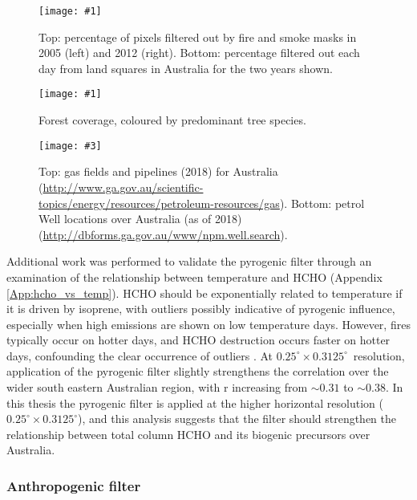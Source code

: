 \documentclass[acp, manuscript]{copernicus}
\newcommand{\parencite}{\citep}
\newcommand{\textcite}{\citet}
\newcommand{\highhr}{$0.25^{\circ} \times 0.3125^{\circ}$}
\newcommand{\mypic}[3]{%
  \begin{figure}
    \texttt{[image: \#1]}
    \caption{#2}
    #3
  \end{figure}
}
\newcommand{\mypicwh}[5]{
  \begin{figure}
    \captionsetup{width=#1}
    \texttt{[image: \#3]}
    \caption{#4}
    #5
  \end{figure}
}
\begin{document}
    \mypic{Figures/Filters/Pyrogenic_filter_annotated_3.png}{%
      Top: percentage of pixels filtered out by fire and smoke masks in 2005 (left) and 2012 (right).
      Bottom: percentage filtered out each day from land squares in Australia for the two years shown.
    }{\label{Model:filter:fire:fig_portion_filtered_2005}}
    
    \mypic{Figures/Australiasforests_2016.png}{%
      Forest coverage, coloured by predominant tree species.
    }{\label{Model:filter:fire:fig_forest_coverage}}
    
    \mypicwh{\textwidth}{\textheight}{Figures/Gas_Petrol_AUS.jpg}{%
      Top: gas fields and pipelines (2018) for Australia (\url{http://www.ga.gov.au/scientific-topics/energy/resources/petroleum-resources/gas}).
      Bottom: petrol Well locations over Australia (as of 2018) (\url{http://dbforms.ga.gov.au/www/npm.well.search}).
    }{\label{Model:filter:fire:fig_petrol_and_gas}}
    
    
    
    Additional work was performed to validate the pyrogenic filter through an examination of the relationship between temperature and HCHO (Appendix \ref{App:hcho_vs_temp}).
    HCHO should be exponentially related to temperature if it is driven by isoprene, with outliers possibly indicative of pyrogenic influence, especially when high emissions are shown on low temperature days.
    However, fires typically occur on hotter days, and HCHO destruction occurs faster on hotter days, confounding the clear occurrence of outliers \parencite[e.g.][]{Zheng2015}. 
    At \highhr ~resolution, application of the pyrogenic filter slightly strengthens the correlation over the wider south eastern Australian region, with r increasing from $\sim{0.31}$ to $\sim{0.38}$.
    In this thesis the pyrogenic filter is applied at the higher horizontal resolution (\highhr), and this analysis suggests that the filter should strengthen the relationship between total column HCHO and its biogenic precursors over Australia.
    
    \subsubsection{Anthropogenic filter}
    \label{Model:filter:NOx}
    
\end{document}
